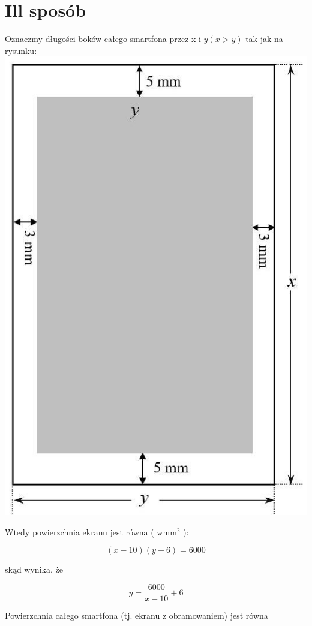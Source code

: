\documentclass[10pt]{article}
\begin{document}
\section*{Ill sposób}
Oznaczmy długości boków całego smartfona przez x i $y(x>y)$ tak jak na rysunku:\\
\includegraphics[max width=\textwidth, center]{2025_02_07_176452ab2cb6278af830g-39}

Wtedy powierzchnia ekranu jest równa ( $\mathrm{w} \mathrm{mm}^{2}$ ):

$$
(x-10)(y-6)=6000
$$

skąd wynika, że

$$
y=\frac{6000}{x-10}+6
$$

Powierzchnia całego smartfona (tj. ekranu z obramowaniem) jest równa
\end{document}
